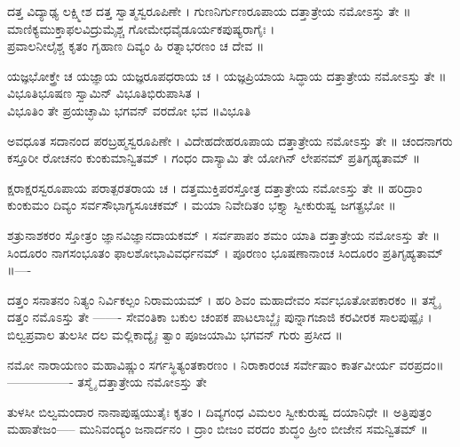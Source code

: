ದತ್ತ ವಿದ್ಯಾಢ್ಯ ಲಕ್ಷ್ಮೀಶ ದತ್ತ ಸ್ವಾತ್ಮಸ್ವರೂಪಿಣೇ ।
ಗುಣನಿರ್ಗುಣರೂಪಾಯ ದತ್ತಾತ್ರೇಯ ನಮೋಽಸ್ತು ತೇ ॥
ಮಾಣಿಕ್ಯಮುಕ್ತಾಫಲವಿದ್ರುಮೈಶ್ಚ ಗೋಮೇಧವೈಡೂರ್ಯಕಪುಷ್ಯರಾಗೈಃ ।\\
ಪ್ರವಾಲನೀಲೈಶ್ಚ ಕೃತಂ ಗೃಹಾಣ ದಿವ್ಯಂ ಹಿ ರತ್ನಾಭರಣಂ ಚ ದೇವ ॥


ಯಜ್ಞಭೋಕ್ತ್ರೇ ಚ ಯಜ್ಞಾಯ ಯಜ್ಞರೂಪಧರಾಯ ಚ ।
ಯಜ್ಞಪ್ರಿಯಾಯ ಸಿದ್ಧಾಯ ದತ್ತಾತ್ರೇಯ ನಮೋಽಸ್ತು ತೇ ॥
ವಿಭೂತಿಭೂಷಣ ಸ್ವಾಮಿನ್ ವಿಭೂತಿಭಿರುಪಾಸಿತ ।\\
ವಿಭೂತಿಂ ತೇ ಪ್ರಯಚ್ಛಾಮಿ ಭಗವನ್ ವರದೋ ಭವ ॥ವಿಭೂತಿ

ಅವಧೂತ ಸದಾನಂದ ಪರಬ್ರಹ್ಮಸ್ವರೂಪಿಣೇ ।
ವಿದೇಹದೇಹರೂಪಾಯ ದತ್ತಾತ್ರೇಯ ನಮೋಽಸ್ತು ತೇ ॥
ಚಂದನಾಗರು ಕಸ್ತೂರೀ ರೋಚನಂ ಕುಂಕುಮಾನ್ವಿತಮ್ ।
ಗಂಧಂ ದಾಸ್ಯಾಮಿ ತೇ ಯೋಗಿನ್ ಲೇಪನಮ್ ಪ್ರತಿಗೃಹ್ಯತಾಮ್ ॥

ಕ್ಷರಾಕ್ಷರಸ್ವರೂಪಾಯ ಪರಾತ್ಪರತರಾಯ ಚ ।
ದತ್ತಮುಕ್ತಿಪರಸ್ತೋತ್ರ ದತ್ತಾತ್ರೇಯ ನಮೋಽಸ್ತು ತೇ ॥
ಹರಿದ್ರಾಂ ಕುಂಕುಮಂ ದಿವ್ಯಂ ಸರ್ವಸೌಭಾಗ್ಯಸೂಚಕಮ್ ।
ಮಯಾ ನಿವೇದಿತಂ ಭಕ್ತ್ಯಾ ಸ್ವೀಕುರುಷ್ವ ಜಗತ್ಪ್ರಭೋ ॥

ಶತ್ರುನಾಶಕರಂ ಸ್ತೋತ್ರಂ ಜ್ಞಾನವಿಜ್ಞಾನದಾಯಕಮ್ ।
ಸರ್ವಪಾಪಂ ಶಮಂ ಯಾತಿ ದತ್ತಾತ್ರೇಯ ನಮೋಽಸ್ತು ತೇ ॥
ಸಿಂದೂರಂ ನಾಗಸಂಭೂತಂ ಫಾಲಶೋಭಾವಿವರ್ಧನಮ್ ।
ಪೂರಣಂ ಭೂಷಣಾನಾಂಚ ಸಿಂದೂರಂ ಪ್ರತಿಗೃಹ್ಯತಾಮ್ ॥----

ದತ್ತಂ ಸನಾತನಂ ನಿತ್ಯಂ ನಿರ್ವಿಕಲ್ಪಂ ನಿರಾಮಯಮ್ ।
ಹರಿ ಶಿವಂ ಮಹಾದೇವಂ ಸರ್ವಭೂತೋಪಕಾರಕಂ ॥
ತಸ್ಮೈ ದತ್ತಂ ನಮೊಽಸ್ತು ತೇ -------
ಸೇವಂತಿಕಾ ಬಕುಲ ಚಂಪಕ ಪಾಟಲಾಬ್ಜೈಃ ಪುನ್ನಾಗಜಾಜಿ ಕರವೀರಕ ಸಾಲಪುಷ್ಪೈಃ ।
ಬಿಲ್ವಪ್ರವಾಲ ತುಲಸೀ ದಲ ಮಲ್ಲಿಕಾದ್ಯೈಃ ತ್ವಾಂ ಪೂಜಯಾಮಿ ಭಗವನ್ ಗುರು ಪ್ರಸೀದ ॥

ನಮೋ ನಾರಾಯಣಂ ಮಹಾವಿಷ್ಣುಂ ಸರ್ಗಸ್ಥಿತ್ಯಂತಕಾರಣಂ ।
ನಿರಾಕಾರಂಚ ಸರ್ವೇಷಾಂ ಕಾರ್ತವೀರ್ಯ ವರಪ್ರದಂ॥----------------
ತಸ್ಮೈ ದತ್ತಾತ್ರೇಯ ನಮೋಽಸ್ತು ತೇ

ತುಳಸೀ ಬಿಲ್ವಮಂದಾರ ನಾನಾಪುಷ್ಪಯುತೈಃ ಕೃತಂ ।
ದಿವ್ಯಗಂಧ ವಿಮಲಂ ಸ್ವೀಕುರುಷ್ವ ದಯಾನಿಧೇ ॥
ಅತ್ರಿಪುತ್ರಂ ಮಹಾತೇಜಂ----- ಮುನಿವಂದ್ಯಂ ಜನಾರ್ದನಂ ।
ದ್ರಾಂ ಬೀಜಂ ವರದಂ ಶುದ್ಧಂ ಹ್ರೀಂ ಬೀಜೇನ ಸಮನ್ವಿತಮ್ ॥

